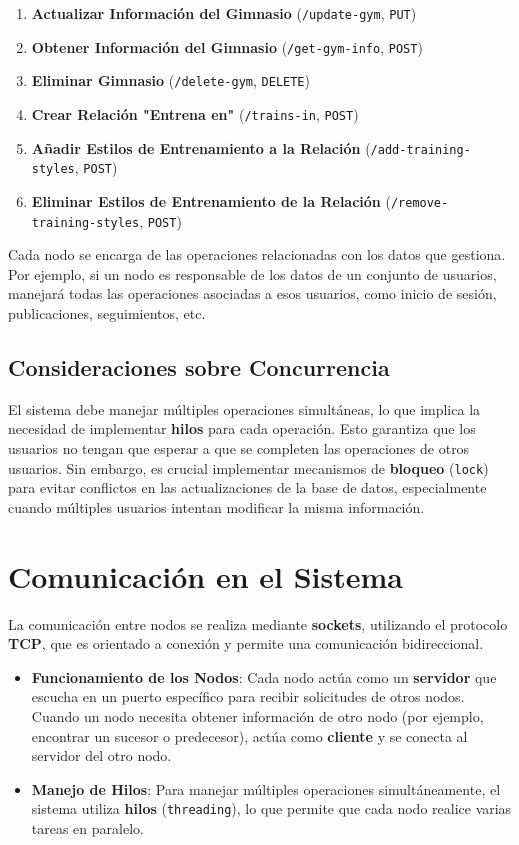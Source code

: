 \documentclass{article}
\begin{document}
\begin{enumerate}
    \item \textbf{Actualizar Información del Gimnasio} (\texttt{/update-gym}, \texttt{PUT})
    \item \textbf{Obtener Información del Gimnasio} (\texttt{/get-gym-info}, \texttt{POST})
    \item \textbf{Eliminar Gimnasio} (\texttt{/delete-gym}, \texttt{DELETE})
    \item \textbf{Crear Relación "Entrena en"} (\texttt{/trains-in}, \texttt{POST})
    \item \textbf{Añadir Estilos de Entrenamiento a la Relación} (\texttt{/add-training-styles}, \texttt{POST})
    \item \textbf{Eliminar Estilos de Entrenamiento de la Relación} (\texttt{/remove-training-styles}, \texttt{POST})
\end{enumerate}

Cada nodo se encarga de las operaciones relacionadas con los datos que gestiona. Por ejemplo, si un nodo es responsable de los datos de un conjunto de usuarios, manejará todas las operaciones asociadas a esos usuarios, como inicio de sesión, publicaciones, seguimientos, etc.

\subsection{Consideraciones sobre Concurrencia}

El sistema debe manejar múltiples operaciones simultáneas, lo que implica la necesidad de implementar \textbf{hilos} para cada operación. Esto garantiza que los usuarios no tengan que esperar a que se completen las operaciones de otros usuarios. Sin embargo, es crucial implementar mecanismos de \textbf{bloqueo} (\texttt{lock}) para evitar conflictos en las actualizaciones de la base de datos, especialmente cuando múltiples usuarios intentan modificar la misma información.

\section{Comunicación en el Sistema}

La comunicación entre nodos se realiza mediante \textbf{sockets}, utilizando el protocolo \textbf{TCP}, que es orientado a conexión y permite una comunicación bidireccional.

\begin{itemize}
    \item \textbf{Funcionamiento de los Nodos}: Cada nodo actúa como un \textbf{servidor} que escucha en un puerto específico para recibir solicitudes de otros nodos. Cuando un nodo necesita obtener información de otro nodo (por ejemplo, encontrar un sucesor o predecesor), actúa como \textbf{cliente} y se conecta al servidor del otro nodo.
    \item \textbf{Manejo de Hilos}: Para manejar múltiples operaciones simultáneamente, el sistema utiliza \textbf{hilos} (\texttt{threading}), lo que permite que cada nodo realice varias tareas en paralelo.
\end{itemize}
\end{document}
